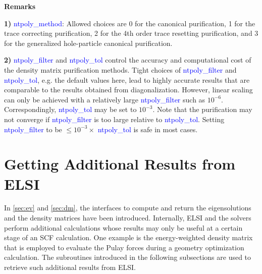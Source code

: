 \documentclass{report}
\begin{document}
\textbf{Remarks}

\textbf{1)} \textcolor{blue}{ntpoly\_method}:  Allowed choices are 0 for the canonical purification, 1 for the trace correcting purification, 2 for the 4th order trace resetting purification, and 3 for the generalized hole-particle canonical purification.

\textbf{2)} \textcolor{blue}{ntpoly\_filter} and \textcolor{blue}{ntpoly\_tol} control the accuracy and computational cost of the density matrix purification methods.  Tight choices of \textcolor{blue}{ntpoly\_filter} and \textcolor{blue}{ntpoly\_tol}, e.g. the default values here, lead to highly accurate results that are comparable to the results obtained from diagonalization.  However, linear scaling can only be achieved with a relatively large \textcolor{blue}{ntpoly\_filter} such as $10^{-6}$.  Correspondingly, \textcolor{blue}{ntpoly\_tol} may be set to $10^{-3}$.  Note that the purification may not converge if \textcolor{blue}{ntpoly\_filter} is too large relative to \textcolor{blue}{ntpoly\_tol}.  Setting \textcolor{blue}{ntpoly\_filter} to be $\le 10^{-3} \times $ \textcolor{blue}{ntpoly\_tol} is safe in most cases.

\section{Getting Additional Results from ELSI}
\label{sec:getter}
In \ref{sec:ev} and \ref{sec:dm}, the interfaces to compute and return the eigensolutions and the density matrices have been introduced.  Internally, ELSI and the solvers perform additional calculations whose results may only be useful at a certain stage of an SCF calculation.  One example is the energy-weighted density matrix that is employed to evaluate the Pulay forces during a geometry optimization calculation.  The subroutines introduced in the following subsections are used to retrieve such additional results from ELSI.
\end{document}
